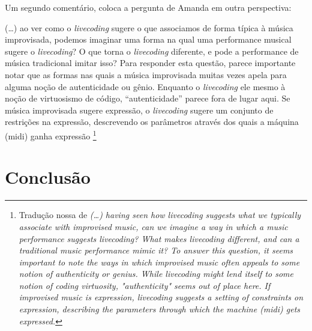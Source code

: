 \documentclass[
	12pt,				%
	openright,			%
	twoside,			%
	a4paper,			%
	english,			%
	french,				%
	spanish,			%
        italian,                        %
	brazil				%
	]{abntex2}
\begin{document}
Um segundo comentário, coloca a pergunta de Amanda em outra perspectiva:

\begin{citacao}
(\ldots) ao ver como o \emph{livecoding} sugere o que associamos de forma típica à música improvisada, podemos imaginar uma forma na qual uma performance musical sugere o \emph{livecoding}? O que torna o \emph{livecoding} diferente, e pode a performance de música tradicional imitar isso? Para responder esta questão, parece importante notar que as formas nas quais a música improvisada muitas vezes apela para alguma noção de autenticidade ou gênio. Enquanto o \emph{livecoding} ele mesmo à noção de virtuosismo de código, ``autenticidade'' parece fora de lugar aqui. Se música improvisada sugere expressão, o \emph{livecoding} sugere um conjunto de restrições na expressão, descrevendo os parâmetros através dos quais a máquina (midi) ganha expressão \footnote{Tradução nossa de \emph{(\ldots) having seen how livecoding suggests what we typically associate with improvised music, can we imagine a way in which a music performance suggests livecoding? What makes livecoding different, and can a traditional music performance mimic it? To answer this question, it seems important to note the ways in which improvised music often appeals to some notion of authenticity or genius. While livecoding might lend itself to some notion of coding virtuosity, "authenticity" seems out of place here. If improvised music is expression, livecoding suggests a setting of constraints on expression, describing the parameters through which the machine (midi) gets expressed.}}
\end{citacao}



\chapter{Conclusão}


%
\postextual



%
%



\begin{apendicesenv}

%
%
%


\end{apendicesenv}


\printindex
\end{document}
